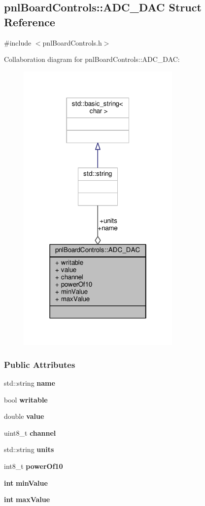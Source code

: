 \subsection{pnl\+Board\+Controls\+:\+:A\+D\+C\+\_\+\+D\+AC Struct Reference}
\label{structpnlBoardControls_1_1ADC__DAC}


{\ttfamily \#include $<$pnl\+Board\+Controls.\+h$>$}



Collaboration diagram for pnl\+Board\+Controls\+:\+:A\+D\+C\+\_\+\+D\+AC\+:
\nopagebreak
\begin{figure}[H]
\begin{center}
\leavevmode
\includegraphics[width=226pt]{d8/d67/structpnlBoardControls_1_1ADC__DAC__coll__graph}
\end{center}
\end{figure}
\subsubsection*{Public Attributes}
\begin{DoxyCompactItemize}
\item 
std\+::string {\bf name}
\item 
bool {\bf writable}
\item 
double {\bf value}
\item 
uint8\+\_\+t {\bf channel}
\item 
std\+::string {\bf units}
\item 
int8\+\_\+t {\bf power\+Of10}
\item 
{\bf int} {\bf min\+Value}
\item 
{\bf int} {\bf max\+Value}
\end{DoxyCompactItemize}


